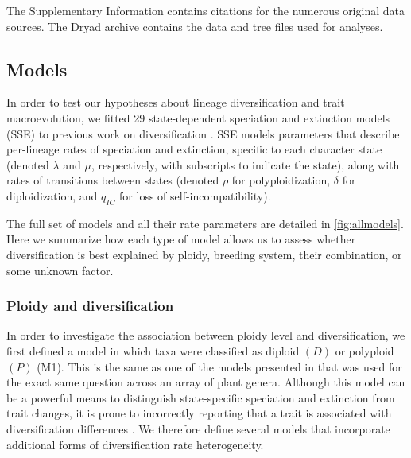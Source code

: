 The Supplementary Information contains citations for the numerous original data sources. %
The Dryad archive contains the data and tree files used for analyses. %

\subsection{Models}

In order to test our hypotheses about lineage diversification and trait macroevolution, we fitted 29 state-dependent speciation and extinction models (SSE) to previous work on diversification \citep[BiSSE, MuSSE, HiSSE;][]{maddison_2007, fitzjohn_2012, beaulieu_2016}.
SSE models parameters that describe per-lineage rates of speciation and extinction, specific to each character state (denoted $\lambda$ and $\mu$, respectively, with subscripts to indicate the state), along with rates of transitions between states (denoted $\rho$ for polyploidization, $\delta$ for diploidization, and $q_{IC}$ for loss of self-incompatibility).

The full set of models and all their rate parameters are detailed in \cref{fig:allmodels}.
Here we summarize how each type of model allows us to assess whether diversification is best explained by ploidy, breeding system, their combination, or some unknown factor.

\subsubsection{Ploidy and diversification}

In order to investigate the association between ploidy level and diversification, we first defined a model in which taxa were classified as diploid $(D)$ or polyploid $(P)$ (M1).
This is the same as one of the models presented in  \citet{mayrose_2011} that was used for the exact same question across an array of plant genera.
Although this model can be a powerful means to distinguish state-specific speciation and extinction from trait changes, it is prone to incorrectly reporting that a trait is associated with diversification differences \citep{maddison_2015, rabosky_2015}.
We therefore define several models that incorporate additional forms of diversification rate heterogeneity.

